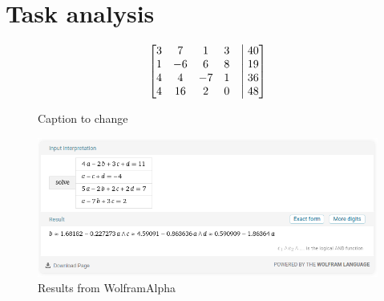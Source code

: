\section{Task analysis}

\begin{figure}[htbp]
    \begin{minipage}{0.5\textwidth}
      \centering
      
    \end{minipage}%
    \begin{minipage}{0.5\textwidth}
      \centering
      $$\begin{bmatrix}
        3 & 7  & 1 & 3 &\bigm| 40 \\
        1 & -6 & 6 & 8 &\bigm| 19 \\
        4 & 4 & -7 & 1 &\bigm| 36 \\
        4 & 16 & 2 & 0 &\bigm| 48 \\
      \end{bmatrix}$$
    \end{minipage}
    \caption{Caption to change}
\end{figure}

\begin{figure}[H]
  \centering
  \includegraphics[width=14cm]{images/lineq1.png}
  \caption{Results from WolframAlpha}
  \label{fig:lineq1}
\end{figure}
